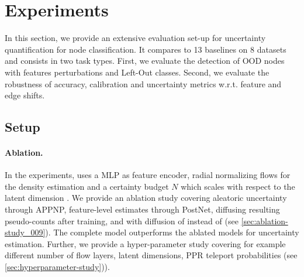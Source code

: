 \section{Experiments} 
\label{sec:experiments_009}

In this section, we provide an extensive evaluation set-up for uncertainty quantification for node classification. It compares \textbf{\GPNacro{}} to 13 baselines on 8 datasets and consists in two task types. First, we evaluate the detection of OOD nodes with features perturbations and Left-Out classes. Second, we evaluate the robustness of accuracy, calibration and uncertainty metrics w.r.t. feature and edge shifts.

\subsection{Setup}

\paragraph{Ablation.} In the experiments, \GPNacro{} uses a MLP as feature encoder, radial normalizing flows \citep{radialflow} for the density estimation and a certainty budget $N$ which scales with respect to the latent dimension \citep{NatPN2021}. We provide an ablation study covering aleatoric uncertainty through APPNP, feature-level estimates through PostNet, diffusing resulting pseudo-counts after training, and \GPNacro{} with diffusion of  instead of  (see \cref{sec:ablation-study_009}). The complete \GPNacro{} model outperforms the ablated models for uncertainty estimation. Further, we provide a hyper-parameter study covering for example different number of flow layers, latent dimensions, PPR teleport probabilities (see \cref{sec:hyperparameter-study})). 

